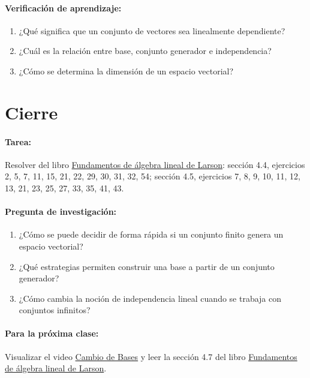 \documentclass[a4,11pt]{aleph-notas}
\begin{document}
\paragraph{Verificación de aprendizaje:}
\begin{enumerate}[leftmargin=*]
    \item ¿Qué significa que un conjunto de vectores sea linealmente dependiente?
    \item ¿Cuál es la relación entre base, conjunto generador e independencia?
    \item ¿Cómo se determina la dimensión de un espacio vectorial?
\end{enumerate}

\section*{Cierre}

\paragraph{Tarea:}
Resolver del libro \href{https://catalogobiblioteca.puce.edu.ec/cgi-bin/koha/opac-detail.pl?biblionumber=86081}{Fundamentos de álgebra lineal de Larson}: sección 4.4, ejercicios 2, 5, 7, 11, 15, 21, 22, 29, 30, 31, 32, 54; sección 4.5, ejercicios 7, 8, 9, 10, 11, 12, 13, 21, 23, 25, 27, 33, 35, 41, 43.

\paragraph{Pregunta de investigación:}
\begin{enumerate}[leftmargin=*]
    \item ¿Cómo se puede decidir de forma rápida si un conjunto finito genera un espacio vectorial?
    \item ¿Qué estrategias permiten construir una base a partir de un conjunto generador?
    \item ¿Cómo cambia la noción de independencia lineal cuando se trabaja con conjuntos infinitos?
\end{enumerate}

\paragraph{Para la próxima clase:}  
Visualizar el video \href{https://youtu.be/LYlaRDsi_T8?si=3zNWorDZfwZVS3Eq}{Cambio de Bases} y leer la sección 4.7 del libro \href{https://catalogobiblioteca.puce.edu.ec/cgi-bin/koha/opac-detail.pl?biblionumber=86081}{Fundamentos de álgebra lineal de Larson}.
\end{document}
